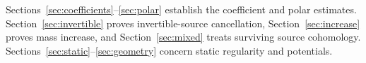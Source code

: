 Sections~\ref{sec:coefficients}--\ref{sec:polar} establish the coefficient
and polar estimates. Section~\ref{sec:invertible} proves invertible-source
cancellation, Section~\ref{sec:increase} proves mass increase, and
Section~\ref{sec:mixed} treats surviving source cohomology.
Sections~\ref{sec:static}--\ref{sec:geometry} concern static regularity
and potentials.
